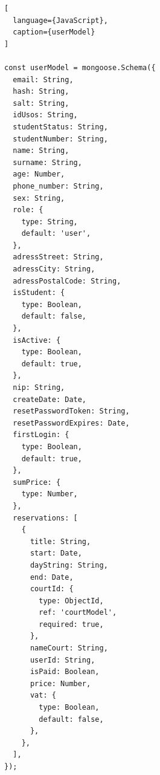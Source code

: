 \documentclass[titlepage]{article}
\begin{document}
\begin{lstlisting}[
  language={JavaScript},
  caption={userModel}
]

const userModel = mongoose.Schema({
  email: String,
  hash: String,
  salt: String,
  idUsos: String, 
  studentStatus: String, 
  studentNumber: String, 
  name: String,
  surname: String,
  age: Number,
  phone_number: String,
  sex: String,
  role: {
    type: String,
    default: 'user',
  },
  adressStreet: String,
  adressCity: String,
  adressPostalCode: String,
  isStudent: {
    type: Boolean,
    default: false,
  }, 
  isActive: {
    type: Boolean,
    default: true,
  },
  nip: String,
  createDate: Date,
  resetPasswordToken: String,
  resetPasswordExpires: Date,
  firstLogin: {
    type: Boolean,
    default: true,
  },
  sumPrice: {
    type: Number,
  },
  reservations: [
    {
      title: String,
      start: Date,
      dayString: String,
      end: Date,
      courtId: {
        type: ObjectId,
        ref: 'courtModel',
        required: true,
      },
      nameCourt: String,
      userId: String,
      isPaid: Boolean,
      price: Number,
      vat: {
        type: Boolean,
        default: false,
      },
    },
  ],
});


\end{lstlisting}
\end{document}
